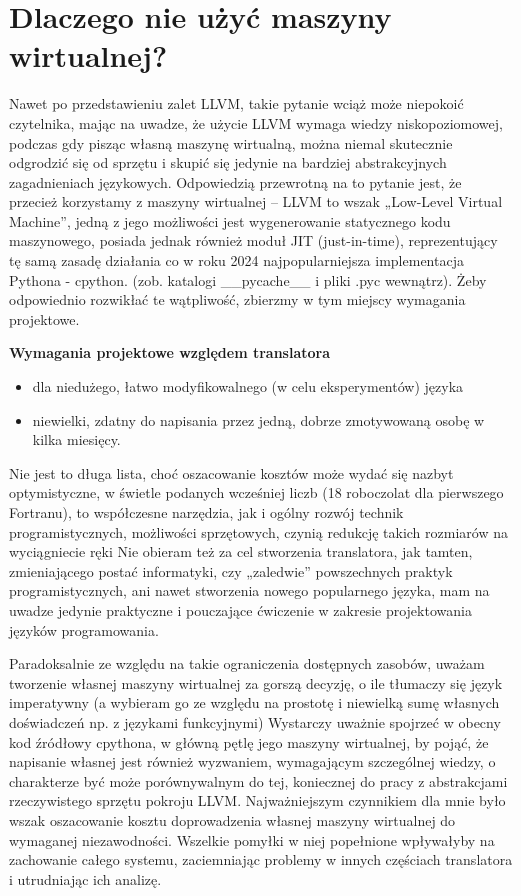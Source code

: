\section{Dlaczego nie użyć maszyny wirtualnej?}
Nawet po przedstawieniu zalet LLVM, takie pytanie wciąż może niepokoić czytelnika, mając na uwadze, że użycie LLVM wymaga wiedzy niskopoziomowej, podczas gdy pisząc własną maszynę wirtualną, można niemal skutecznie odgrodzić się od sprzętu i skupić się jedynie na bardziej abstrakcyjnych zagadnieniach językowych. 
Odpowiedzią przewrotną na to pytanie jest, że przecież korzystamy z maszyny wirtualnej – LLVM to wszak „Low-Level Virtual Machine”, jedną z jego możliwości jest wygenerowanie statycznego kodu maszynowego, posiada jednak również moduł JIT (just-in-time), reprezentujący tę samą zasadę działania co w roku 2024 najpopularniejsza implementacja Pythona - cpython. (zob. katalogi \_\_pycache\_\_ i pliki .pyc wewnątrz). Żeby odpowiednio rozwikłać te wątpliwość, zbierzmy w tym miejscy wymagania projektowe.

\textbf{Wymagania projektowe względem translatora}
\begin{itemize}[noitemsep]
    \item dla niedużego, łatwo modyfikowalnego (w celu eksperymentów) języka
    \item niewielki, zdatny do napisania przez jedną, dobrze zmotywowaną osobę w kilka miesięcy.
\end{itemize}

Nie jest to długa lista, choć oszacowanie kosztów może wydać się nazbyt optymistyczne, w świetle podanych wcześniej liczb (18 roboczolat dla pierwszego Fortranu), to współczesne narzędzia, jak i ogólny rozwój technik programistycznych, możliwości sprzętowych, czynią redukcję takich rozmiarów na wyciągniecie ręki Nie obieram też za cel stworzenia translatora, jak tamten, zmieniającego postać informatyki, czy „zaledwie” powszechnych praktyk programistycznych, ani nawet stworzenia nowego popularnego języka, mam na uwadze jedynie praktyczne i pouczające ćwiczenie w zakresie projektowania języków programowania.

Paradoksalnie ze względu na takie ograniczenia dostępnych zasobów, uważam tworzenie własnej maszyny wirtualnej za gorszą decyzję, o ile tłumaczy się język imperatywny (a wybieram go ze względu na prostotę i niewielką sumę własnych doświadczeń np. z językami funkcyjnymi) Wystarczy uważnie spojrzeć w obecny kod źródłowy cpythona, w główną pętlę jego maszyny wirtualnej\cite{cpython_main_loop}, by pojąć, że napisanie własnej jest również wyzwaniem, wymagającym szczególnej wiedzy, o charakterze być może porównywalnym do tej, koniecznej do pracy z abstrakcjami rzeczywistego sprzętu pokroju LLVM. Najważniejszym czynnikiem dla mnie było wszak oszacowanie kosztu doprowadzenia własnej maszyny wirtualnej do wymaganej niezawodności. Wszelkie pomyłki w niej popełnione wpływałyby na zachowanie całego systemu, zaciemniając problemy w innych częściach translatora i utrudniając ich analizę. 

